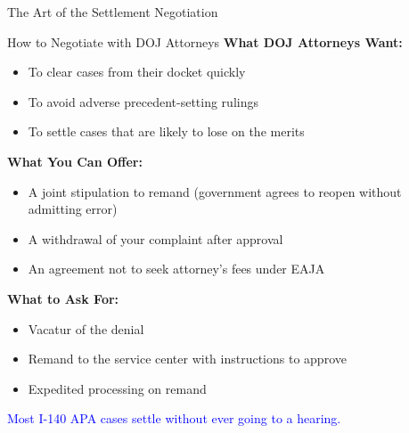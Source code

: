 \documentclass[11pt]{beamer}
\begin{document}
	
	\begin{frame}{The Art of the Settlement Negotiation}
		\scriptsize
		\begin{block}{How to Negotiate with DOJ Attorneys}
			\textbf{What DOJ Attorneys Want:}
			\begin{itemize}
				\item To clear cases from their docket quickly
				\item To avoid adverse precedent-setting rulings
				\item To settle cases that are likely to lose on the merits
			\end{itemize}
			\textbf{What You Can Offer:}
			\begin{itemize}
				\item A joint stipulation to remand (government agrees to reopen without admitting error)
				\item A withdrawal of your complaint after approval
				\item An agreement not to seek attorney's fees under EAJA
			\end{itemize}
			\textbf{What to Ask For:}
			\begin{itemize}
				\item Vacatur of the denial
				\item Remand to the service center with instructions to approve
				\item Expedited processing on remand
			\end{itemize}
			\textcolor{blue}{Most I-140 APA cases settle without ever going to a hearing.}
		\end{block}
	\end{frame}
	
\end{document}
